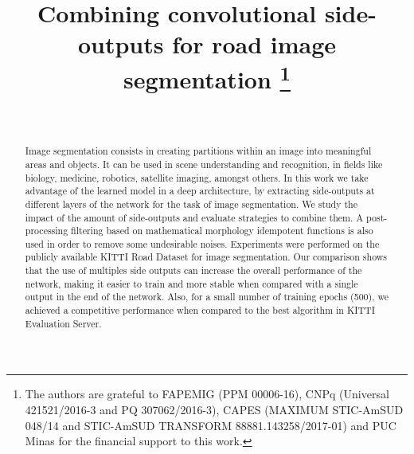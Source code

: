 \documentclass[conference]{IEEEtran}
\begin{document}
\title{Combining convolutional side-outputs for road image segmentation
\thanks{The authors are grateful to FAPEMIG (PPM 00006-16), CNPq (Universal 421521/2016-3 and PQ 307062/2016-3), CAPES (MAXIMUM STIC-AmSUD 048/14 and STIC-AmSUD TRANSFORM 88881.143258/2017-01) and PUC Minas for the financial support to this work.}
}

\author{
\\
}

\maketitle

\begin{abstract}
Image segmentation consists in creating partitions within an image into meaningful areas and objects. It can be used in scene understanding and recognition, in fields like biology, medicine, robotics, satellite imaging, amongst others. In this work we take advantage of the learned model in a deep architecture, by extracting side-outputs at different layers of the network  for the task of image segmentation. We study the impact of the amount of side-outputs and evaluate strategies to combine them. A post-processing filtering based on mathematical morphology idempotent functions is also used in order to remove some undesirable noises. Experiments were performed on the publicly available KITTI Road Dataset for image segmentation. Our comparison shows that the use of multiples side outputs can increase the overall performance of the network, making it easier to train and more stable when compared with a single output in the end of the network. Also, for a small number of training epochs (500), we achieved a competitive performance when compared to the best algorithm in KITTI Evaluation Server.
\end{abstract}
\end{document}
